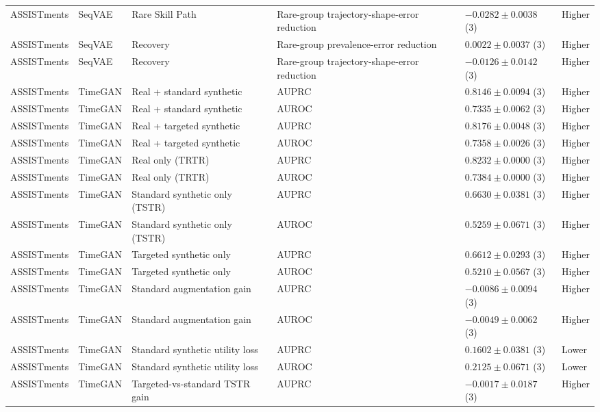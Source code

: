 \begin{longtable}{@{}p{2.25cm}p{2.05cm}p{4.7cm}p{5.0cm}p{2.6cm}p{1.25cm}@{}}
ASSISTments & SeqVAE & Rare Skill Path & Rare-group trajectory-shape-error reduction & $-0.0282 \mathbin{\pm} 0.0038$ (3) & Higher \\
ASSISTments & SeqVAE & Recovery & Rare-group prevalence-error reduction & $0.0022 \mathbin{\pm} 0.0037$ (3) & Higher \\
ASSISTments & SeqVAE & Recovery & Rare-group trajectory-shape-error reduction & $-0.0126 \mathbin{\pm} 0.0142$ (3) & Higher \\
ASSISTments & TimeGAN & Real + standard synthetic & AUPRC & $0.8146 \mathbin{\pm} 0.0094$ (3) & Higher \\
ASSISTments & TimeGAN & Real + standard synthetic & AUROC & $0.7335 \mathbin{\pm} 0.0062$ (3) & Higher \\
ASSISTments & TimeGAN & Real + targeted synthetic & AUPRC & $0.8176 \mathbin{\pm} 0.0048$ (3) & Higher \\
ASSISTments & TimeGAN & Real + targeted synthetic & AUROC & $0.7358 \mathbin{\pm} 0.0026$ (3) & Higher \\
ASSISTments & TimeGAN & Real only (TRTR) & AUPRC & $0.8232 \mathbin{\pm} 0.0000$ (3) & Higher \\
ASSISTments & TimeGAN & Real only (TRTR) & AUROC & $0.7384 \mathbin{\pm} 0.0000$ (3) & Higher \\
ASSISTments & TimeGAN & Standard synthetic only (TSTR) & AUPRC & $0.6630 \mathbin{\pm} 0.0381$ (3) & Higher \\
ASSISTments & TimeGAN & Standard synthetic only (TSTR) & AUROC & $0.5259 \mathbin{\pm} 0.0671$ (3) & Higher \\
ASSISTments & TimeGAN & Targeted synthetic only & AUPRC & $0.6612 \mathbin{\pm} 0.0293$ (3) & Higher \\
ASSISTments & TimeGAN & Targeted synthetic only & AUROC & $0.5210 \mathbin{\pm} 0.0567$ (3) & Higher \\
ASSISTments & TimeGAN & Standard augmentation gain & AUPRC & $-0.0086 \mathbin{\pm} 0.0094$ (3) & Higher \\
ASSISTments & TimeGAN & Standard augmentation gain & AUROC & $-0.0049 \mathbin{\pm} 0.0062$ (3) & Higher \\
ASSISTments & TimeGAN & Standard synthetic utility loss & AUPRC & $0.1602 \mathbin{\pm} 0.0381$ (3) & Lower \\
ASSISTments & TimeGAN & Standard synthetic utility loss & AUROC & $0.2125 \mathbin{\pm} 0.0671$ (3) & Lower \\
ASSISTments & TimeGAN & Targeted-vs-standard TSTR gain & AUPRC & $-0.0017 \mathbin{\pm} 0.0187$ (3) & Higher \\

\end{longtable}
